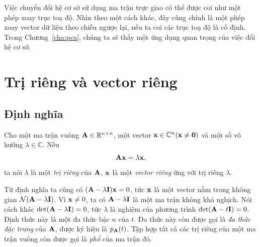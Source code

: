 Việc chuyển đổi hệ cơ sở sử dụng ma trận trực giao có thể được coi như một phép
xoay trục toạ độ. Nhìn theo một cách khác, đây cũng chính là một phép xoay
vector dữ liệu theo chiều ngược lại, nếu ta coi các trục toạ độ là cố định.
Trong Chương~\ref{cha:pca}, chúng ta sẽ thấy một ứng dụng quan trọng của
việc đổi hệ cơ sở.



\section{Trị riêng và vector riêng} %
\label{sec:tri_rieng_ve_vector_rieng}

\subsection{Định nghĩa} %
\label{sub:dinh_nghia}


Cho một ma trận vuông $\mathbf{A} \in \mathbb{R}^{n\times n}$, một vector $\mathbf{x} \in \mathbb{C}^n (\mathbf{x}
\neq \mathbf{0} )$ và một số vô hướng $\lambda \in \mathbb{C}$. Nếu
\begin{equation}
\mathbf{A}\mathbf{x} = \lambda \mathbf{x},
\end{equation}
ta nói $\lambda$ là một \textit{trị riêng} của $\mathbf{A}$, $\mathbf{x}$ là một \textit{vector riêng} ứng với trị riêng $\lambda$.



Từ định nghĩa ta cũng có $(\mathbf{A} - \lambda \mathbf{I})\mathbf{x} = 0$, tức $\mathbf{x}$ là một vector nằm trong không gian $\mathcal{N}(\mathbf{A} - \lambda \mathbf{I})$. Vì $\mathbf{x} \neq 0$, ta có  $\mathbf{A} - \lambda \mathbf{I}$ là một ma
trận không khả nghịch. Nói cách khác $\det(\mathbf{A} - \lambda \mathbf{I}) = 0$, tức
$\lambda$ là nghiệm của phương trình $\det(\mathbf{A} -t \mathbf{I}) = 0$.
Định thức này là một đa thức bậc $n$ của $t$. Đa thức này còn được gọi là
\textit{đa thức đặc trưng} của $\mathbf{A}$, được ký hiệu là $p_{\mathbf{A}}(t)$. Tập hợp tất
cả các trị riêng của một ma trận vuông còn được gọi là \textit{phổ} của ma trận
đó.

